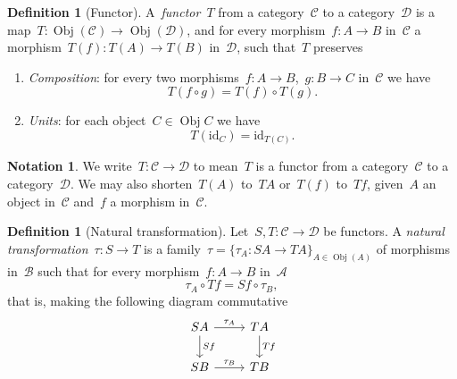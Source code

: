 \documentclass[a4paper]{article}
\theoremstyle{plain}
\theoremstyle{definition}
\newtheorem{definition}[theorem]{Definition}
\newtheorem{notation}[theorem]{Notation}
\DeclareMathOperator{\Obj}{Obj}
\newcommand{\id}{\mathrm{id}}
\newcommand{\cat}[1]{\mathcal{#1}}
\begin{document}
\begin{definition}[Functor]
    \label{def:functor}
    A~\emph{functor}~\(T\) from a category~\(\cat{C}\) to a category~\(\cat{D}\)
    is a map~\(T:\Obj(\cat{C})\longrightarrow\Obj(\cat{D})\), and for every
    morphism~\(f:A\longrightarrow B\) in~\(\cat{C}\) a
    morphism~\(T(f):T(A)\longrightarrow T(B)\) in~\(\cat{D}\), such that~\(T\)
    preserves
    \begin{enumerate}
        \item \emph{Composition}: for every two
            morphisms~\(f:A\longrightarrow B\),~\(g:B\longrightarrow C\)
            in~\(\cat{C}\) we have
            \[
                T(f \circ g) = T(f) \circ T(g).
            \]
        \item \emph{Units}: for each object~\(C\in\Obj{C}\) we have
            \[
                T(\id_{C}) = \id_{T(C)}.
            \]
    \end{enumerate}
\end{definition}

\begin{notation}
    We write~\(T:\cat{C}\longrightarrow\cat{D}\) to mean~\(T\) is a functor from
    a category~\(\cat{C}\) to a category~\(\cat{D}\).
    We may also shorten~\(T(A)\) to~\(TA\) or~\(T(f)\) to~\(Tf\), given~\(A\) an
    object in~\(\cat{C}\) and~\(f\) a morphism in~\(\cat{C}\).
\end{notation}

\begin{definition}[Natural transformation]
    \label{def:natural-transformation}
    Let~\(S,T:\cat{C}\longrightarrow\cat{D}\) be functors. A \emph{natural
    transformation}~\(\tau:S\longrightarrow T\) is a
    family~\(\tau=\{\tau_{A}:SA\longrightarrow TA\}_{A\in\Obj(A)}\) of morphisms
    in~\(\cat{B}\) such that for every morphism~\(f:A\longrightarrow B\)
    in~\(\cat{A}\)
    \[
        \tau_{A} \circ Tf = Sf \circ \tau_{B},
    \]
    that is, making the following diagram commutative
    \[
        \begin{tikzcd}
            SA \arrow[r, "\tau_{A}"] \arrow[d, "Sf"] & TA \arrow[d, "Tf"] \\
            SB \arrow[r, "\tau_{B}"] & TB
        \end{tikzcd}
    \]
\end{definition}
\end{document}
